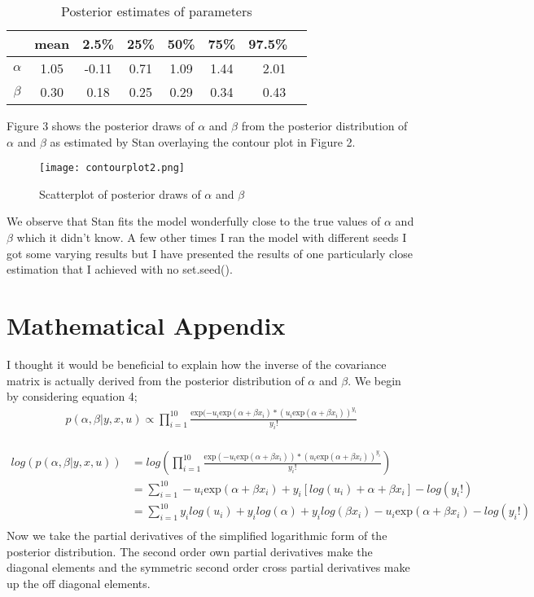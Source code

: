 \documentclass{article}
\begin{document}
\begin{table}[ht]
\caption {Posterior estimates of parameters}
\vspace{2mm}
\centering \begin{tabular}{c c c c c c c} 
\hline\hline 
\vspace{1mm}
& mean & 2.5\% &  25\% &  50\% &  75\% & 97.5\% \ \\ [0.5ex] 
\hline 
$\alpha$ & 1.05 & -0.11 & 0.71 & 1.09 & 1.44 & 2.01 \\ 
$\beta$ & 0.30 & 0.18 & 0.25 & 0.29 & 0.34 & 0.43 \\[1ex] \hline 
\end{tabular}
\end{table}

Figure 3 shows the posterior draws of $\alpha$ and $\beta$ from the posterior distribution of $\alpha$ and $\beta$ as estimated by Stan overlaying the contour plot in Figure 2.
 \begin{figure}[H]
\centering
\texttt{[image: contourplot2.png]}
\caption{Scatterplot of posterior draws of $\alpha$ and $\beta$ }
\label{deltat}
\end{figure}
We observe that Stan fits the model wonderfully close to the true values of $\alpha$ and $\beta$ which it didn't know. A few other times I ran the model with different seeds I got some varying results but I have presented the results of one particularly close estimation that I achieved with no set.seed().
\newpage
\section{Mathematical Appendix}
I thought it would be beneficial to explain how the inverse of the covariance matrix is actually derived from the posterior distribution of $\alpha$ and $\beta$. We begin by considering equation 4;
\begin{align*}
p(\alpha, \beta | y, x, u) \propto \prod_{i=1}^{10}\frac{\text{exp}(-u_i\text{exp}(\alpha + \beta x_i) * (u_i\text{exp}(\alpha + \beta x_i))^{y_i}}{y_i !}
\end{align*}
\\
\begin{align*}
log(p(\alpha, \beta | y, x, u)) &= log(\prod_{i=1}^{10}\frac{\text{exp}(-u_i\text{exp}(\alpha + \beta x_i)) * (u_i\text{exp}(\alpha + \beta x_i))^{y_i}}{y_i !})\\
&= \sum_{i=1}^{10}-u_i\text{exp}(\alpha + \beta x_i) + y_i [log(u_i) + \alpha + \beta x_i] - log(y_i!)\\
&= \sum_{i=1}^{10}y_ilog(u_i) + y_ilog(\alpha) + y_ilog(\beta x_i) - u_i\text{exp}(\alpha + \beta x_i) -  log(y_i!)\\
\end{align*}
Now we take the partial derivatives of the simplified logarithmic form of the posterior distribution. The second order own partial derivatives make the diagonal elements and the symmetric second order cross partial derivatives make up the off diagonal elements.
\end{document}

